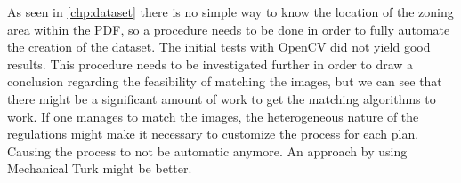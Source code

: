 As seen in \autoref{chp:dataset} there is no simple way to know the location of the zoning area within the PDF, so a procedure needs to be done in order to fully automate the creation of the dataset. The initial tests with OpenCV did not yield good results. This procedure needs to be investigated further in order to draw a conclusion regarding the feasibility of matching the images, but we can see that there might be a significant amount of work to get the matching algorithms to work. If one manages to match the images, the heterogeneous nature of the regulations might make it necessary to customize the process for each plan. Causing the process to not be automatic anymore. An approach by using Mechanical Turk might be better.
